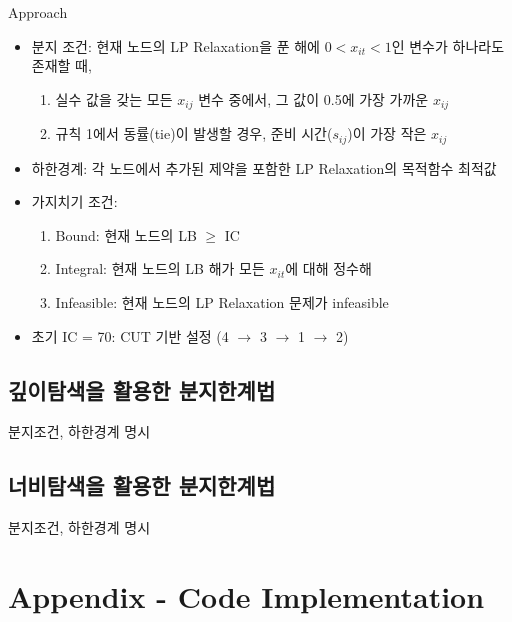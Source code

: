 \documentclass[10pt]{article}
\begin{document}
\newpage
\begin{stabilitybox}{Approach}
    \begin{itemize}[leftmargin=1em]
        \item 분지 조건: 현재 노드의 LP Relaxation을 푼 해에 $0 < x_{it} < 1$인 변수가 하나라도 존재할 때,
        \begin{enumerate}
            \item 실수 값을 갖는 모든 $x_{ij}$ 변수 중에서, 그 값이 0.5에 가장 가까운 $x_{ij}$
            \item 규칙 1에서 동률(tie)이 발생할 경우, 준비 시간($s_{ij}$)이 가장 작은 $x_{ij}$
        \end{enumerate}
        \item 하한경계: 각 노드에서 추가된 제약을 포함한 LP Relaxation의 목적함수 최적값
        \item 가지치기 조건: 
        \begin{enumerate}
            \item Bound: 현재 노드의 LB $\ge$ IC
            \item Integral: 현재 노드의 LB 해가 모든 $x_{it}$에 대해 정수해
            \item Infeasible: 현재 노드의 LP Relaxation 문제가 infeasible
        \end{enumerate}
        \item 초기 IC = 70: CUT 기반 설정 (4 $\to$ 3 $\to$ 1 $\to$ 2)
    \end{itemize}
\end{stabilitybox}

\subsection{깊이탐색을 활용한 분지한계법}
분지조건, 하한경계 명시


\subsection{너비탐색을 활용한 분지한계법} 
분지조건, 하한경계 명시


\newpage
\section*{Appendix - Code Implementation}

    
\end{document}
